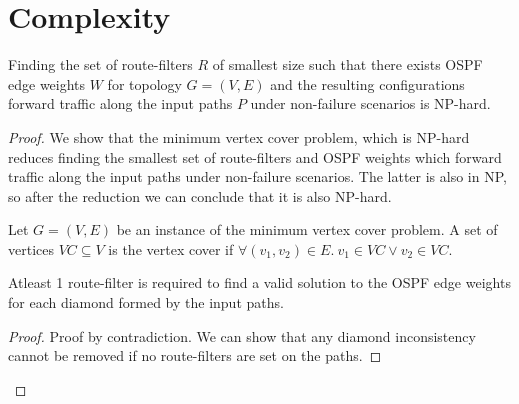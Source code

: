 \section{Complexity}
\begin{theorem}
Finding the set of route-filters $R$ of smallest size such
 that there exists OSPF edge weights $W$ for topology $G=(V,E)$ 
 and the resulting configurations forward traffic along the
input paths $P$ under non-failure scenarios is NP-hard.
\end{theorem}

\begin{proof}
We show that the minimum vertex cover problem, which is NP-hard 
reduces finding the smallest set of route-filters and OSPF weights 
which forward traffic along the
input paths under non-failure scenarios. 
The latter is also in NP, so after the reduction we 
can conclude that it is also NP-hard.

Let $G = (V,E)$ be an instance of the 
minimum vertex cover problem. A set of
vertices $VC \subseteq V$ is the vertex cover
if $\forall (v_1, v_2) \in E. ~v_1 \in VC \vee v_2 \in VC$. 
\begin{lemma}
	Atleast 1 route-filter is required to find a valid solution to the
	OSPF edge weights for each diamond formed by the input paths.
\end{lemma}
\begin{proof}
	Proof by contradiction. We can show that any diamond inconsistency 
	cannot be removed if no route-filters are set on the paths.
\end{proof}
\end{proof}